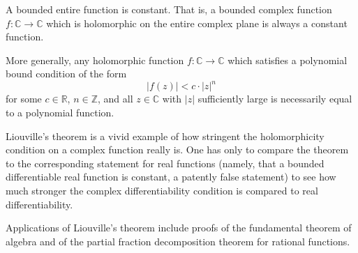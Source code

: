 \documentclass[12pt]{article}
\begin{document}
A bounded entire function is constant. That is, a bounded complex function $f: \mathbb{C} \to \mathbb{C}$ which is holomorphic on the entire complex plane is always a constant function.

More generally, any holomorphic function $f: \mathbb{C} \to \mathbb{C}$ which satisfies a polynomial bound condition of the form
$$
|f(z)| < c \cdot |z|^n
$$
for some $c \in \mathbb{R}$, $n \in \mathbb{Z}$, and all $z \in \mathbb{C}$ with $|z|$ sufficiently large is necessarily equal to a polynomial function.

Liouville's theorem is a vivid example of how stringent the holomorphicity condition on a complex function really is. One has only to compare the theorem to the corresponding statement for real functions (namely, that a bounded differentiable real function is constant, a patently false statement) to see how much stronger the complex differentiability condition is compared to real differentiability.

Applications of Liouville's theorem include proofs of the fundamental theorem of algebra and of the partial fraction decomposition theorem for rational functions.
\end{document}
